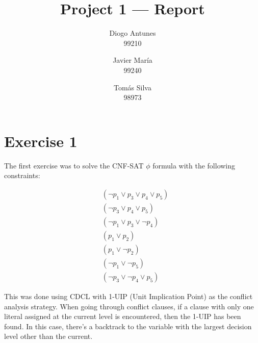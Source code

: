 \documentclass[12pt]{article}
\begin{document}
\title{Project 1 — Report}
\author{
  Diogo Antunes\\
  99210
  \and
  Javier María\\
  99240
  \and
  Tomás Silva\\
  98973
}

\maketitle

\section*{Exercise 1}

The first exercise was to solve the CNF-SAT $\phi$ formula with the following constraints:

\begin{align}
        & (\lnot p_{1} \vee p_{3} \vee p_{4} \vee p_{5}) \\
        & (\lnot p_{3} \vee p_{4} \vee p_{5}) \\
        & (\lnot p_{1} \vee p_{3} \vee \lnot p_{4}) \\
        & (p_{1} \vee p_{2}) \\
        & (p_{1} \vee \lnot p_{2}) \\
        & (\lnot p_{1} \vee \lnot p_{5}) \\
        & (\lnot p_{3} \vee \lnot p_{4} \vee p_{5})
\end{align}

\vspace{0.5cm}

This was done using CDCL with 1-UIP (Unit Implication Point) as the conflict analysis strategy.
When going through conflict clauses, if a clause with only one literal assigned at the current level is encountered, then the 1-UIP has been found.
In this case, there's a backtrack to the variable with the largest decision level other than the current.

\vspace{0.5cm}
\end{document}
